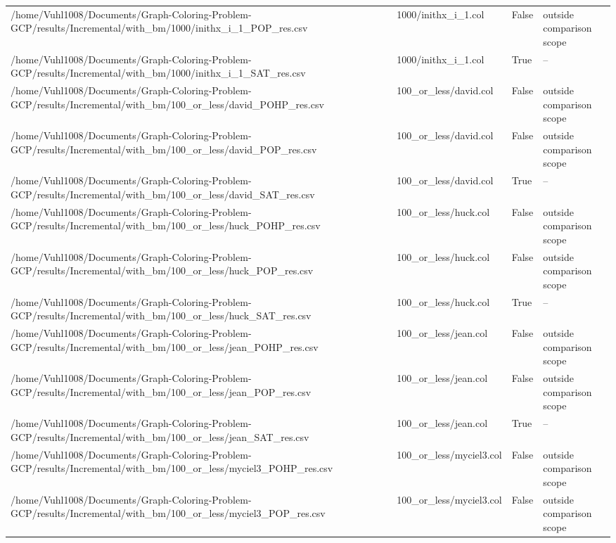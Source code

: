 \begin{table}[htbp]
\begin{tabular}{llll}
/home/Vuhl1008/Documents/Graph-Coloring-Problem-GCP/results/Incremental/with\_bm/1000/inithx\_i\_1\_POP\_res.csv & 1000/inithx\_i\_1.col & False & outside comparison scope \\
/home/Vuhl1008/Documents/Graph-Coloring-Problem-GCP/results/Incremental/with\_bm/1000/inithx\_i\_1\_SAT\_res.csv & 1000/inithx\_i\_1.col & True & -- \\
/home/Vuhl1008/Documents/Graph-Coloring-Problem-GCP/results/Incremental/with\_bm/100\_or\_less/david\_POHP\_res.csv & 100\_or\_less/david.col & False & outside comparison scope \\
/home/Vuhl1008/Documents/Graph-Coloring-Problem-GCP/results/Incremental/with\_bm/100\_or\_less/david\_POP\_res.csv & 100\_or\_less/david.col & False & outside comparison scope \\
/home/Vuhl1008/Documents/Graph-Coloring-Problem-GCP/results/Incremental/with\_bm/100\_or\_less/david\_SAT\_res.csv & 100\_or\_less/david.col & True & -- \\
/home/Vuhl1008/Documents/Graph-Coloring-Problem-GCP/results/Incremental/with\_bm/100\_or\_less/huck\_POHP\_res.csv & 100\_or\_less/huck.col & False & outside comparison scope \\
/home/Vuhl1008/Documents/Graph-Coloring-Problem-GCP/results/Incremental/with\_bm/100\_or\_less/huck\_POP\_res.csv & 100\_or\_less/huck.col & False & outside comparison scope \\
/home/Vuhl1008/Documents/Graph-Coloring-Problem-GCP/results/Incremental/with\_bm/100\_or\_less/huck\_SAT\_res.csv & 100\_or\_less/huck.col & True & -- \\
/home/Vuhl1008/Documents/Graph-Coloring-Problem-GCP/results/Incremental/with\_bm/100\_or\_less/jean\_POHP\_res.csv & 100\_or\_less/jean.col & False & outside comparison scope \\
/home/Vuhl1008/Documents/Graph-Coloring-Problem-GCP/results/Incremental/with\_bm/100\_or\_less/jean\_POP\_res.csv & 100\_or\_less/jean.col & False & outside comparison scope \\
/home/Vuhl1008/Documents/Graph-Coloring-Problem-GCP/results/Incremental/with\_bm/100\_or\_less/jean\_SAT\_res.csv & 100\_or\_less/jean.col & True & -- \\
/home/Vuhl1008/Documents/Graph-Coloring-Problem-GCP/results/Incremental/with\_bm/100\_or\_less/myciel3\_POHP\_res.csv & 100\_or\_less/myciel3.col & False & outside comparison scope \\
/home/Vuhl1008/Documents/Graph-Coloring-Problem-GCP/results/Incremental/with\_bm/100\_or\_less/myciel3\_POP\_res.csv & 100\_or\_less/myciel3.col & False & outside comparison scope \\

\end{tabular}
\end{table}
